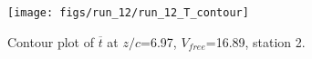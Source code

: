 \begin{figure}[H]
\centering
\texttt{[image: figs/run\_12/run\_12\_T\_contour]}
\caption{Contour plot of $\overline{t}$ at $z/c$=6.97, $V_{free}$=16.89, station 2.}
\label{fig:run_12_T_contour}
\end{figure}


